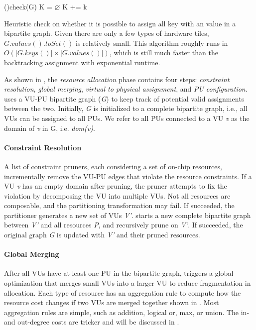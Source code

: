 \begin{algorithm}
  \Fn(){check(G)}{
     {
      K = $\varnothing$\;
       {
         {
           {
            K += k\;
          }
        }
      }
       {
        \;
      }
    }
    \;
  }
  \caption{Heuristic check on whether it is possible to assign all key with an value in a bipartite
  graph. Given there are only a few types of hardware tiles, $G.values().toSet()$ is
  relatively small. This algorithm roughly runs in $O(|G.keys()|\times|G.values()|)$, which is
  still much faster than the backtracking assignment with exponential runtime.}
  \label{algo:check}
\end{algorithm}
 
As shown in , the \emph{resource allocation} phase contains four steps:
\emph{constraint resolution}, \emph{global merging}, \emph{virtual to physical assignment},
and \emph{PU configuration}.
\name uses a VU-PU bipartite graph (\emph{G}) to keep track of potential valid assignments between the two.
Initially, \emph{G} is initialized to a complete bipartite graph, i.e., all VUs can be assigned to
all PUs.
We refer to all PUs connected to a VU \emph{v} as the domain of \emph{v} in G, i.e. \emph{dom(v)}.

\paragraph{Constraint Resolution}
A list of constraint pruners, each considering a set of on-chip resources, 
incrementally remove the VU-PU edges that violate the resource constraints.
If a VU \emph{v} has an empty domain after pruning, the pruner attempts to fix the violation by
decomposing the VU into multiple VUs. 
Not all resources are composable, and the partitioning transformation may fail.
If succeeded, the partitioner generates a new set of VUs \emph{V'}. \name starts a new complete bipartite
graph between \emph{V'} and all resources \emph{P}, and recursively prune on \emph{V'}.
If succeeded, the original graph \emph{G} is updated with \emph{V'} and their pruned resources.

\paragraph{Global Merging}
After all VUs have at least one PU in the bipartite graph, \name triggers a global optimization that merges 
small VUs into a larger VU to reduce fragmentation in allocation.
Each type of resource has an aggregation rule to compute how the resource cost changes if two VUs are merged
together shown in . 
Most aggregation rules are simple, such as addition, logical or, max, or union.
The in- and out-degree costs are tricker and will be discussed in .


